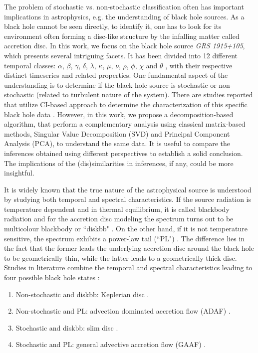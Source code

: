 \documentclass[journal]{IEEEtran}
\begin{document}
	The problem of stochastic vs. non-stochastic classification often has important implications in astrophysics, e.g. the understanding of black hole
sources. As a black hole cannot be seen directly, to identify it, one has to look for its environment often forming a disc-like structure by the infalling matter called accretion disc. In this work, we focus on the black hole source \textit{GRS 1915+105}, which presents several intriguing facets. It has been divided into 12 different temporal classes: $\alpha$, $\beta$, $\gamma$, $\delta$, $\lambda$, $\kappa$, $\mu$, $\nu$, $\rho$, $\phi$, $\chi$ and $\theta$ \cite{Belloni2000}, with their respective distinct timeseries and related properties. One fundamental aspect of the understanding is to determine if the black hole source is stochastic or non-stochastic (related to turbulent nature of the system). There are studies reported that utilize CI-based approach to determine the characterization of this specific black hole data \cite{Mukhopadhyay2004, misra2006, Adegoke2018}. However, in this work, we propose a decomposition-based algorithm, that perform a complementary analysis using classical matrix-based methods, Singular Value Decomposition (SVD) and Principal Component Analysis (PCA), to understand the same data. It is useful to compare the inferences obtained using different perspectives to establish a solid conclusion. The implications of the (dis)similarities in inferences, if any, could be more insightful.
	
	It is widely known that the true nature of the astrophysical source is understood by studying both temporal and spectral characteristics. If the source radiation is temperature dependent and in thermal equilibrium, it is called blackbody radiation and for the accretion disc modeling the spectrum turns out to be 
multicolour blackbody or ``diskbb" \cite{Shakura1973}. On the other hand, if it is not temperature sensitive, the spectrum exhibits a power-law tail (``PL") \cite{chakrabarti1995,narayan1994}. The difference lies in the fact that the former leads the underlying accretion disc around the black hole to be geometrically thin, while the latter leads to a geometrically thick disc. Studies in literature combine the temporal and spectral characteristics leading to four possible black hole states \cite{Adegoke2018}:
	\begin{enumerate}
		\item Non-stochastic and diskbb: Keplerian disc \cite{Shakura1973}.
		\item Non-stochastic and PL: advection dominated accretion flow (ADAF)  \cite{narayan1994}.
		\item Stochastic and diskbb: slim disc \cite{Abramowicz1988}.
		\item Stochastic and PL: general advective accretion flow (GAAF) \cite{chakrabarti1995, rajesh2010}.
	\end{enumerate}
	
\end{document}
